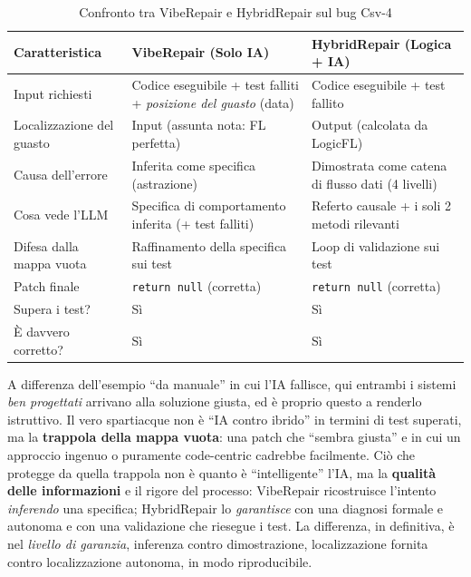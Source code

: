 \begin{table}[H]
\centering
\caption{Confronto tra VibeRepair e HybridRepair sul bug Csv-4}
\vspace{2mm}
\small
\begin{tabularx}{\textwidth}{l >{\raggedright\arraybackslash}X >{\raggedright\arraybackslash}X}
\toprule
\textbf{Caratteristica} & \textbf{VibeRepair (Solo IA)} & \textbf{HybridRepair (Logica + IA)} \\
\midrule
Input richiesti & Codice eseguibile + test falliti + \emph{posizione del guasto} (data)
  & Codice eseguibile + test fallito \\
Localizzazione del guasto & Input (assunta nota: FL perfetta)
  & Output (calcolata da LogicFL) \\
Causa dell'errore & Inferita come specifica (astrazione)
  & Dimostrata come catena di flusso dati (4 livelli) \\
Cosa vede l'LLM & Specifica di comportamento inferita (+ test falliti)
  & Referto causale + i soli 2 metodi rilevanti \\
Difesa dalla mappa vuota & Raffinamento della specifica sui test
  & Loop di validazione sui test \\
Patch finale & \texttt{return null} (corretta) & \texttt{return null} (corretta) \\
Supera i test? & Sì & Sì \\
È davvero corretto? & Sì & Sì \\
\bottomrule
\end{tabularx}
\end{table}

A differenza dell'esempio ``da manuale'' in cui l'IA fallisce, qui entrambi i sistemi
\emph{ben progettati} arrivano alla soluzione giusta, ed è proprio questo a renderlo
istruttivo. Il vero spartiacque non è ``IA contro ibrido'' in termini di test superati, ma la
\textbf{trappola della mappa vuota}: una patch che ``sembra giusta'' e in cui un approccio
ingenuo o puramente code-centric cadrebbe facilmente. Ciò che protegge da quella trappola non è
quanto è ``intelligente'' l'IA, ma la \textbf{qualità delle informazioni} e il rigore del
processo: VibeRepair ricostruisce l'intento \emph{inferendo} una specifica; HybridRepair lo
\emph{garantisce} con una diagnosi formale e autonoma e con una validazione che riesegue i test.
La differenza, in definitiva, è nel \textit{livello di garanzia}, inferenza contro
dimostrazione, localizzazione fornita contro localizzazione autonoma, in modo riproducibile.
